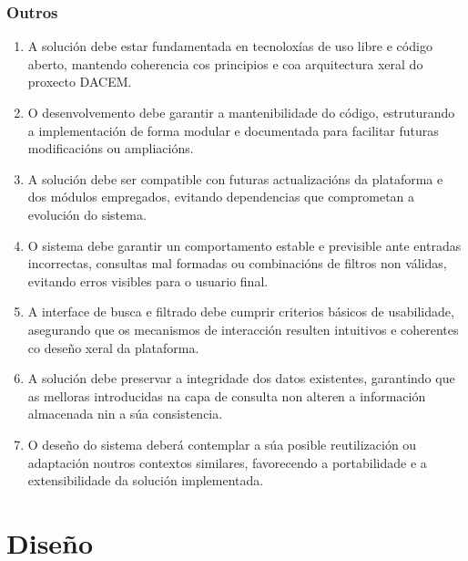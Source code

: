 \documentclass[%
    a4paper,               %
    twoside,                %
    parskip=full,           %
    10pt,                   %
    titlepage=on,           %
    captions=tableabove,    %
]{article}                  %
\begin{document}
\subsubsection{Outros}
\begin{enumerate}
    \item A solución debe estar fundamentada en tecnoloxías de uso libre e código aberto, mantendo coherencia cos principios e coa arquitectura xeral do proxecto DACEM.

    \item O desenvolvemento debe garantir a mantenibilidade do código, estruturando a implementación de forma modular e documentada para facilitar futuras modificacións ou ampliacións.

    \item A solución debe ser compatible con futuras actualizacións da plataforma e dos módulos empregados, evitando dependencias que comprometan a evolución do sistema.

    \item O sistema debe garantir un comportamento estable e previsible ante entradas incorrectas, consultas mal formadas ou combinacións de filtros non válidas, evitando erros visibles para o usuario final.

    \item A interface de busca e filtrado debe cumprir criterios básicos de usabilidade, asegurando que os mecanismos de interacción resulten intuitivos e coherentes co deseño xeral da plataforma.

    \item A solución debe preservar a integridade dos datos existentes, garantindo que as melloras introducidas na capa de consulta non alteren a información almacenada nin a súa consistencia.

    \item O deseño do sistema deberá contemplar a súa posible reutilización ou adaptación noutros contextos similares, favorecendo a portabilidade e a extensibilidade da solución implementada.
\end{enumerate}


\section{Diseño}
\end{document}
